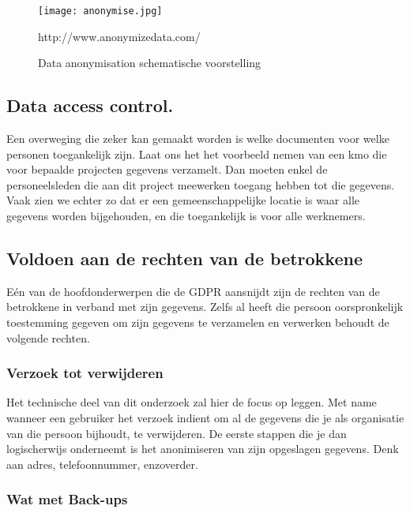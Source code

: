 \begin{figure}[h]
    \texttt{[image: anonymise.jpg]}
    \caption{Data anonymisation schematische voorstelling}
    http://www.anonymizedata.com/
\end{figure}


\subsection{Data access control.}
Een overweging die zeker kan gemaakt worden is welke documenten voor welke personen toegankelijk zijn. Laat ons het het voorbeeld nemen van een kmo die voor bepaalde projecten gegevens verzamelt. Dan moeten enkel de personeelsleden die aan dit project meewerken toegang hebben tot die gegevens.  Vaak zien we echter zo dat er een gemeenschappelijke locatie is waar alle gegevens worden bijgehouden, en die toegankelijk is voor alle werknemers. 

\subsection{Voldoen aan de rechten van de betrokkene}

Eén van de hoofdonderwerpen die de GDPR aansnijdt zijn de rechten van de betrokkene in verband met zijn gegevens. Zelfs al heeft die persoon oorspronkelijk toestemming gegeven om zijn gegevens te verzamelen en verwerken behoudt de volgende rechten.

\subsubsection{Verzoek tot verwijderen}
Het technische deel van dit onderzoek zal hier de focus op leggen. Met name wanneer een gebruiker het verzoek indient om al de gegevens die je als organisatie van die persoon bijhoudt, te verwijderen. De eerste stappen die je dan logischerwijs onderneemt is het anonimiseren van zijn opgeslagen gegevens. Denk aan adres, telefoonnummer, enzoverder. 

\subsubsection{Wat met Back-ups}

